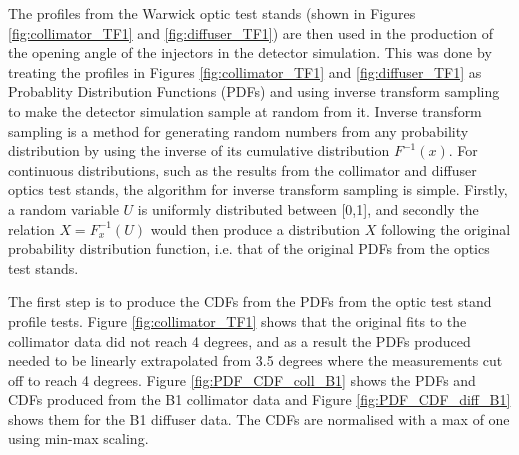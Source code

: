 The profiles from the Warwick optic test stands (shown in Figures \ref{fig:collimator_TF1} and \ref{fig:diffuser_TF1}) are then used in the production of the opening angle of the injectors in the detector simulation. This was done by treating the profiles in Figures \ref{fig:collimator_TF1} and \ref{fig:diffuser_TF1} as Probablity Distribution Functions (PDFs) and using inverse transform sampling to make the detector simulation sample at random from it. Inverse transform sampling is a method for generating random numbers from any probability distribution by using the inverse of its cumulative distribution $F^{-1}(x)$. For continuous distributions, such as the results from the collimator and diffuser optics test stands, the algorithm for inverse transform sampling is simple. Firstly, a random variable $U$ is uniformly distributed between [0,1], and secondly the relation $X = F^{-1}_{x}(U)$ would then produce a distribution $X$ following the original probability distribution function, i.e. that of the original PDFs from the optics test stands. 

The first step is to produce the CDFs from the PDFs from the optic test stand profile tests. Figure \ref{fig:collimator_TF1} shows that the original fits to the collimator data did not reach 4 degrees, and as a result the PDFs produced needed to be linearly extrapolated from 3.5 degrees where the measurements cut off to reach 4 degrees. Figure \ref{fig:PDF_CDF_coll_B1} shows the PDFs and CDFs produced from the B1 collimator data and Figure \ref{fig:PDF_CDF_diff_B1} shows them for the B1 diffuser data. The CDFs are normalised with a max of one using min-max scaling.


